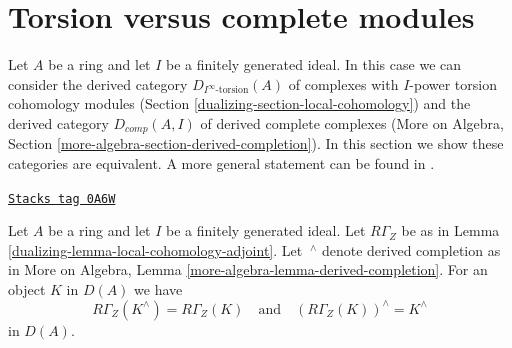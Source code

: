 \section{Torsion versus complete modules}
\label{dualizing-section-torsion-and-complete}
Let $A$ be a ring and let $I$ be a finitely generated ideal.
In this case we can consider the derived category
$D_{I^\infty\text{-torsion}}(A)$ of complexes
with $I$-power torsion cohomology modules
(Section \ref{dualizing-section-local-cohomology})
and the derived category
$D_{comp}(A, I)$ of derived complete complexes
(More on Algebra, Section \ref{more-algebra-section-derived-completion}).
In this section we show these categories are equivalent.
A more general statement can be found in
\cite{Dwyer-Greenlees}.

\begin{lemma}
\label{dualizing-lemma-complete-and-local}
\href{https://stacks.math.columbia.edu/tag/0A6W}{\texttt{Stacks tag 0A6W}}


Let $A$ be a ring and let $I$ be a finitely generated ideal.
Let $R\Gamma_Z$ be as in Lemma \ref{dualizing-lemma-local-cohomology-adjoint}.
Let ${\ }^\wedge$ denote derived completion as in
More on Algebra, Lemma \ref{more-algebra-lemma-derived-completion}.
For an object $K$ in $D(A)$ we have
$$
R\Gamma_Z(K^\wedge) = R\Gamma_Z(K)
\quad\text{and}\quad
(R\Gamma_Z(K))^\wedge = K^\wedge
$$
in $D(A)$.
\end{lemma}

